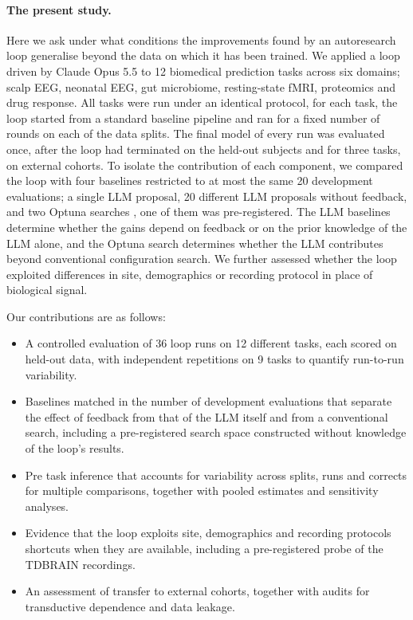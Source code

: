\documentclass[11pt]{article}
\begin{document}
\paragraph{The present study.}\label{sec:intro-study} Here we ask under what conditions the improvements found by an autoresearch loop generalise beyond the data on which it has been trained. We applied a loop driven by Claude Opus 5.5 to 12 biomedical prediction tasks across six domains; scalp EEG, neonatal EEG, gut microbiome, resting-state fMRI, proteomics and drug response. All tasks were run under an identical protocol, for each task, the loop started from a standard baseline pipeline and ran for a fixed number of rounds on each of the data splits. The final model 
of every run was evaluated once, after the loop had terminated on the held-out subjects and for three tasks, on external cohorts.
To isolate the contribution of each component, we compared the loop with four baselines restricted to at most the same 20 development evaluations; a single LLM proposal, 20 different LLM proposals without feedback, and two Optuna searches \citep{akiba2019optuna}, one of them was pre-registered. The LLM baselines determine 
whether the gains depend on feedback or on the prior knowledge of the LLM alone, and the Optuna search determines whether the LLM contributes beyond conventional configuration search. We further assessed 
whether the loop exploited differences in site, demographics or recording protocol in place of biological signal. 

Our contributions are as follows:
\begin{itemize}
      \item A controlled evaluation of 36 loop runs on 12 different tasks, each scored on held-out data, with independent repetitions on 9 tasks to quantify run-to-run variability.
      \item Baselines matched in the number of development evaluations that separate the effect of feedback from that of the LLM itself and from a conventional search, including a pre-registered search space constructed without knowledge of the loop's results. 
      \item Pre task inference that accounts for variability across splits, runs and corrects for multiple comparisons, together with pooled estimates and sensitivity analyses. 
      \item Evidence that the loop exploits site, demographics and recording protocols shortcuts when they are available, including a pre-registered probe of the TDBRAIN recordings. 
      \item An assessment of transfer to external cohorts, together with audits for transductive dependence and data leakage.
\end{itemize}
\end{document}

